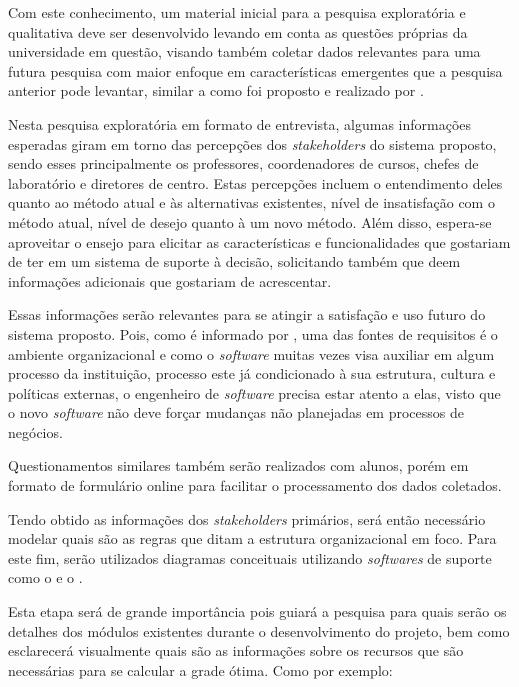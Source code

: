 Com este conhecimento, um material inicial para a pesquisa exploratória e qualitativa deve ser desenvolvido levando em conta as questões próprias da universidade em questão, visando também coletar dados relevantes para uma futura pesquisa com maior enfoque em características emergentes que a pesquisa anterior pode levantar, similar a como foi proposto e realizado por .

Nesta pesquisa exploratória em formato de entrevista, algumas informações esperadas giram em torno das percepções dos \textit{stakeholders} do sistema proposto, sendo esses principalmente os professores, coordenadores de cursos, chefes de laboratório e diretores de centro. Estas percepções incluem o entendimento deles quanto ao método atual e às alternativas existentes, nível de insatisfação com o método atual, nível de desejo quanto à um novo método. Além disso, espera-se aproveitar o ensejo para elicitar as características e funcionalidades que gostariam de ter em um sistema de suporte à decisão, solicitando também que deem informações adicionais que gostariam de acrescentar.

Essas informações serão relevantes para se atingir a satisfação e uso futuro do sistema proposto. Pois, como é informado por , uma das fontes de requisitos é o ambiente organizacional e como o \textit{software} muitas vezes visa auxiliar em algum processo da instituição, processo este já condicionado à sua estrutura, cultura e políticas externas, o engenheiro de \textit{software} precisa estar atento a elas, visto que o novo \textit{software} não deve forçar mudanças não planejadas em processos de negócios.

Questionamentos similares também serão realizados com alunos, porém em formato de formulário online para facilitar o processamento dos dados coletados.

Tendo obtido as informações dos \textit{stakeholders} primários, será então necessário modelar quais são as regras que ditam a estrutura organizacional em foco. Para este fim, serão utilizados diagramas conceituais utilizando \textit{softwares} de suporte como o  e o .

Esta etapa será de grande importância pois guiará a pesquisa para quais serão os detalhes dos módulos existentes durante o desenvolvimento do projeto, bem como esclarecerá visualmente quais são as informações sobre os recursos que são necessárias para se calcular a grade ótima. Como por exemplo:

